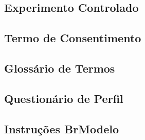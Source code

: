\begin{apendicesenv}
\chapter{Experimento Controlado} \label{EXPERIMENTOCONTROL}

\section{Termo de Consentimento} \label{ap:TermoExp}
    \begin{figure}
        \centering
         
    \end{figure}
\newpage
\section{Glossário de Termos} \label{ap:GlossarioExp}
    \begin{figure}
        \centering
         
    \end{figure}
\newpage
\section{Questionário de Perfil} \label{ap:QuestPerfilExp}
    \begin{figure}
        \centering
         
    \end{figure}
\newpage
\section{Instruções BrModelo} \label{ap:StepBrModeloExp}
    \begin{figure}
        \centering
         
    \end{figure}
\newpage

\end{apendicesenv}

